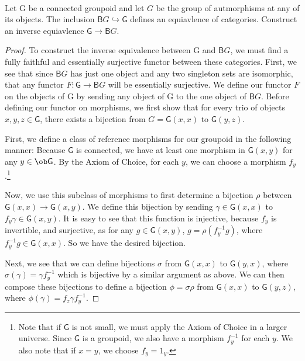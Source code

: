 \documentclass[main.tex]{subfiles}
\begin{document}
\paragraph{}
\begin{exercise}
	Let \textsf{G} be a connected groupoid and let $G$ be
	the group of autmorphisms at any of its objects. The inclusion $\textsf{B}G
	\hookrightarrow \textsf{G}$ defines an equiavlence of categories. Construct an
	inverse equiavlence $\textsf{G} \rightarrow \textsf{B}G$.
\end{exercise}
\begin{proof}
	To construct the inverse equivalence between  \textsf{G} and $\textsf{B}G$,
	we must find a fully faithful and essentially surjective functor between
	these categories. First, we see that since $\textsf{B}G$ has just one
	object and any two singleton sets are isomorphic, that any functor $F\colon \textsf{G} \rightarrow \textsf{B}G$ will be
	essentially surjective. We define our functor $F$ on the objects of
	\textsf{G} by sending any object of \textsf{G} to the one object of
	$\textsf{B}G$. Before defining our functor on morphisms, we first show that
	for every trio of objects $x,y,z \in \textsf{G}$, there exists a bijection
	from $G = \textsf{G}(x,x) $ to $\textsf{G}(y,z)$.

	First, we define a class of reference morphisms for our groupoid in the
	following manner: Because $\textsf{G}$ is connected, we have at least one
	morphism in $\textsf{G} (x,y)$ for any $y \in \ob\textsf{G}$. By the Axiom of
	Choice, for each $y$, we can choose a morphism $f_y$.\footnote{Note that if
		$\textsf{G}$ is not small, we must apply the Axiom of Choice in a larger
		universe. Since $\textsf{G}$ is a groupoid, we also have a morphism
		$f_y^{-1}$ for each $y$. We also note that if $x = y$, we choose $f_y =
	1_y$.}

	Now, we use this subclass of morphisms to first determine a bijection $\rho$
	between $\textsf{G}(x,x) \rightarrow \textsf{G}(x,y)$. We define this
	bijection by sending $\gamma \in \textsf{G}(x,x)$ to $f_y\gamma \in
	\textsf{G}(x,y)$. It is easy to see that this function is injective, because
	$f_y$ is invertible, and surjective, as for any $g \in \textsf{G}(x,y)$, $g
	= \rho(f_y^{-1}g)$, where $f_y^{-1}g \in \textsf{G}(x,x)$. So we have the
	desired bijection.

	Next, we see that we can define bijections  $\sigma$ from $\textsf{G}(x,x)$
	to $\textsf{G}(y,x)$, where $\sigma(\gamma) = \gamma f_y^{-1}$ which is
	bijective by a similar argument as above. We can then compose these
	bijections to define a bijection $\phi = \sigma\rho$ from $\textsf{G}(x,x)$
	to $\textsf{G}(y,z)$, where $\phi(\gamma) = f_z\gamma f_y^{-1}$.


\end{proof}
\end{document}
